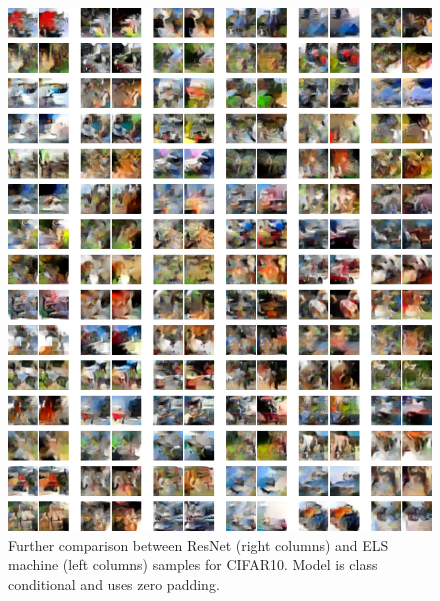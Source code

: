 \documentclass{article}
\theoremstyle{plain}
\theoremstyle{definition}
\theoremstyle{remark}
\begin{document}
\begin{figure}
    \centering
    \includegraphics[width=0.9\linewidth]{cifar10_zeros_samps_resnet_m.png}
    \caption{Further comparison between ResNet (right columns) and ELS machine (left columns) samples for CIFAR10. Model is class conditional and uses zero padding.}
    \label{fig:cifar10-zeros-resnet}
\end{figure}
\end{document}
